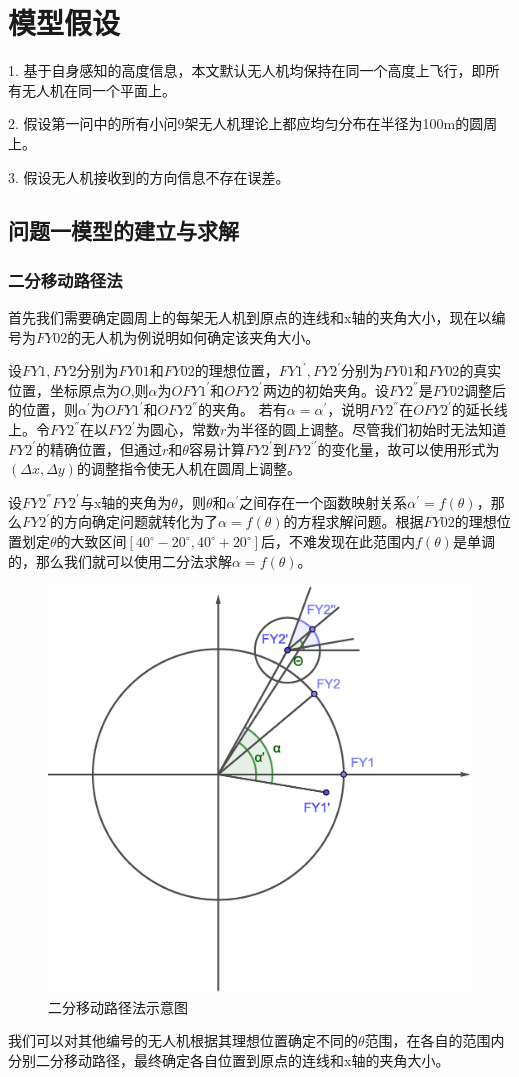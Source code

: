\documentclass{ctexart}
\begin{document}
\section{模型假设}
1. \quad 基于自身感知的高度信息，本文默认无人机均保持在同一个高度上飞行，即所有无人机在同一个平面上。

2. \quad 假设第一问中的所有小问9架无人机理论上都应均匀分布在半径为100m的圆周上。

3. \quad 假设无人机接收到的方向信息不存在误差。


\subsection{问题一模型的建立与求解}


  \subsubsection{二分移动路径法}

  首先我们需要确定圆周上的每架无人机到原点的连线和x轴的夹角大小，现在以编号为$FY02$的无人机为例说明如何确定该夹角大小。

  设$FY1,FY2$分别为$FY01$和$FY02$的理想位置，$FY1^{'},FY2^{'}$分别为$FY01$和$FY02$的真实位置，坐标原点为$O$,则$\alpha$为$OFY1^{'}$和$OFY2^{'}$两边的初始夹角。设$FY2^{''}$是$FY02$调整后的位置，则$\alpha^{'}$为$OFY1^{'}$和$OFY2^{''}$的夹角。
  若有$\alpha = \alpha^{'}$，说明$FY2^{''}$在$OFY2^{'}$的延长线上。令$FY2^{''}$在以$FY2^{'}$为圆心，常数$r$为半径的圆上调整。尽管我们初始时无法知道$FY2^{'}$的精确位置，但通过$r$和$\theta$容易计算$FY2^{'}$到$FY2^{‘'}$的变化量，故可以使用形式为$(\Delta x,\Delta y)$的调整指令使无人机在圆周上调整。
  
  设$FY2^{''}FY2^{'}$与x轴的夹角为$\theta$，则$\theta$和$\alpha^{'}$之间存在一个函数映射关系$\alpha^{'}=f(\theta)$，那么$FY2^{'}$的方向确定问题就转化为了$\alpha=f(\theta)$的方程求解问题。根据$FY02$的理想位置划定$\theta$的大致区间$[40^{\circ}-20^{\circ},40^{\circ}+20^{\circ}]$后，不难发现在此范围内$f(\theta)$是单调的，那么我们就可以使用二分法求解$\alpha=f(\theta)$。

  \begin{figure}[H]
    \centering
    \includegraphics[width=0.45\linewidth]{pic/bisection.eps}
    \caption{二分移动路径法示意图}
    \label{二分移动路径法示意图}
    \end{figure}


    我们可以对其他编号的无人机根据其理想位置确定不同的$\theta$范围，在各自的范围内分别二分移动路径，最终确定各自位置到原点的连线和x轴的夹角大小。
\end{document}

